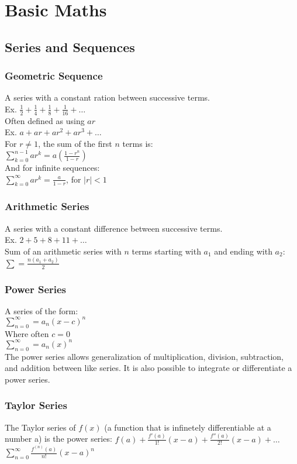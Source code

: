 \section*{Basic Maths}

\subsection*{Series and Sequences}
\subsubsection*{Geometric Sequence}
A series with a constant ration between successive terms.\\
Ex.  $\frac{1}{2}+ \frac{1}{4}+ \frac{1}{8}+ \frac{1}{16}+\ldots$\\
Often defined as using $ar$\\
Ex.  $a+ar+ar^2+ar^3+\ldots$\\
For $r\neq1$, the sum of the first $n$ terms is:\\
$\sum_{k=0}^{n-1}ar^k=a(\frac{1-r^n}{1-r})$\\
And for infinite sequences:\\
$\sum_{k=0}^{\infty}ar^k=\frac{a}{1-r}$, for $|r|<1$\\

\subsubsection*{Arithmetic Series}
A series with a constant difference between successive terms.\\
Ex.  $2+5+8+11+\ldots$\\
Sum of an arithmetic series with $n$ terms starting with $a_1$ and ending with $a_2$:\\
$\sum=\frac{n(a_1+a_2)}{2}$

\subsubsection*{Power Series}
A series of the form:\\
$\sum_{n=0}^{\infty}=a_n{(x-c)}^n$\\
Where often $c=0$\\
$\sum_{n=0}^{\infty}=a_n{(x)}^n$\\
The power series allows generalization of multiplication, division, subtraction, and addition between 
like series. It is also possible to integrate or differentiate a power series.


\subsubsection*{Taylor Series}
The Taylor series of $f(x)$ (a function that is infinetely differentiable at a number a) is the
power series:
$f(a)+\frac{f'(a)}{1!}(x-a)+\frac{f''(a)}{2!}(x-a)+\ldots$
$\sum_{n=0}^\infty\frac{f^{(n)}(a)}{n!}{(x-a)}^n $

